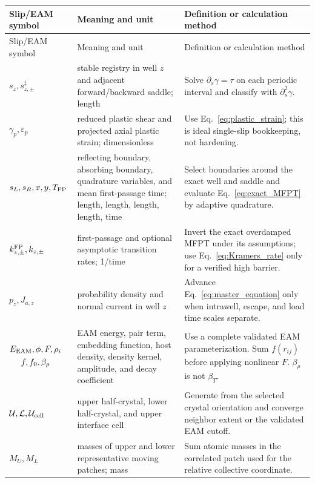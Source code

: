 \begin{longtable}{>{\raggedright\arraybackslash}p{}
                  >{\raggedright\arraybackslash}p{}
                  >{\raggedright\arraybackslash}p{}}
\toprule
Slip/EAM symbol & Meaning and unit & Definition or calculation method\\
\midrule
\endfirsthead
\toprule
Slip/EAM symbol & Meaning and unit & Definition or calculation method\\
\midrule
\endhead
\bottomrule
\endfoot
$s_z,s_{z,\pm}^\ddagger$ & stable registry in well $z$ and adjacent forward/backward saddle; length
& Solve $\partial_s\gamma=\tau$ on each periodic interval and classify with
$\partial_s^2\gamma$.\\
$\gamma_p,\varepsilon_p$ & reduced plastic shear and projected axial plastic strain; dimensionless
& Use Eq.~\eqref{eq:plastic_strain}; this is ideal single-slip bookkeeping, not hardening.\\
$s_L,s_R,x,y,T_{\rm FP}$ & reflecting boundary, absorbing boundary, quadrature variables, and mean
first-passage time; length, length, length, length, time & Select boundaries around the exact well
and saddle and evaluate Eq.~\eqref{eq:exact_MFPT} by adaptive quadrature.\\
$k_{z,\pm}^{\rm FP},k_{z,\pm}$ & first-passage and optional asymptotic transition rates; 1/time &
Invert the exact overdamped MFPT under its assumptions; use Eq.~\eqref{eq:Kramers_rate} only for a
verified high barrier.\\
$p_z,J_{a,z}$ & probability density and normal current in well $z$ & Advance
Eq.~\eqref{eq:master_equation} only when intrawell, escape, and load time scales separate.\\
$\begin{gathered}E_{\rm EAM},\phi,F,\rho_i\\f,f_0,\beta_\rho\end{gathered}$ & EAM energy, pair term, embedding function, host
density, density kernel, amplitude, and decay coefficient & Use a complete validated EAM
parameterization. Sum $f(r_{ij})$ before applying nonlinear $F$. $\beta_\rho$ is not $\beta_T$.\\
$\mathcal U,\mathcal L,\mathcal U_{\rm cell}$ & upper half-crystal, lower half-crystal, and upper
interface cell & Generate from the selected crystal orientation and converge neighbor extent or the
validated EAM cutoff.\\
$M_U,M_L$ & masses of upper and lower representative moving patches; mass & Sum atomic masses in
the correlated patch used for the relative collective coordinate.\\
\end{longtable}
\normalsize

